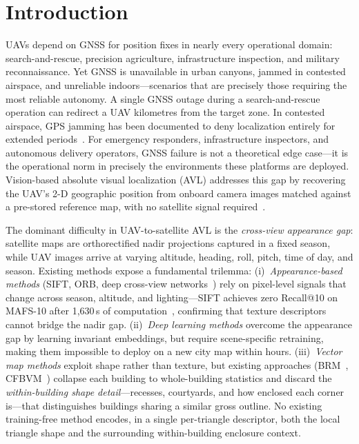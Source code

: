 \documentclass[10pt]{article}
\theoremstyle{plain}
\theoremstyle{definition}
\begin{document}
\section{Introduction}
\label{sec:intro}

UAVs depend on GNSS for position fixes in nearly every operational domain:
search-and-rescue, precision agriculture, infrastructure inspection, and
military reconnaissance.
Yet GNSS is unavailable in urban canyons, jammed in contested airspace, and
unreliable indoors---scenarios that are precisely those requiring the most
reliable autonomy.
A single GNSS outage during a search-and-rescue operation can redirect a UAV
kilometres from the target zone.
In contested airspace, GPS jamming has been documented to deny localization
entirely for extended periods~\cite{murrian2021gnss,dovis2015gnss}.
For emergency responders, infrastructure inspectors, and autonomous delivery
operators, GNSS failure is not a theoretical edge case---it is the operational
norm in precisely the environments these platforms are deployed.
Vision-based absolute visual localization (AVL) addresses this gap by
recovering the UAV's 2-D geographic position from onboard camera images matched
against a pre-stored reference map, with no satellite signal
required~\cite{couturier2021review,ouyang2024cfbvm}.

The dominant difficulty in UAV-to-satellite AVL is the \emph{cross-view
appearance gap}: satellite maps are orthorectified nadir projections captured
in a fixed season, while UAV images arrive at varying altitude, heading, roll,
pitch, time of day, and season.
Existing methods expose a fundamental trilemma:
(i)~\emph{Appearance-based methods} (SIFT, ORB, deep cross-view
networks~\cite{goforth2019gps,fan2024sspt}) rely on pixel-level signals that
change across season, altitude, and lighting---SIFT achieves zero Recall@10 on
MAFS-10 after 1,630\,s of computation~\cite{yuan2025swapf},
confirming that texture descriptors cannot bridge the nadir gap.
(ii)~\emph{Deep learning methods} overcome the appearance gap by learning
invariant embeddings, but require scene-specific retraining, making them
impossible to deploy on a new city map within hours.
(iii)~\emph{Vector map methods} exploit shape rather than texture, but existing
approaches (BRM~\cite{choi2020brm}, CFBVM~\cite{ouyang2024cfbvm}) collapse each
building to whole-building statistics and discard the \emph{within-building
shape detail}---recesses, courtyards, and how enclosed each corner is---that
distinguishes buildings sharing a similar gross outline.
No existing training-free method encodes, in a single per-triangle descriptor,
both the local triangle shape and the surrounding within-building enclosure
context.
\end{document}
